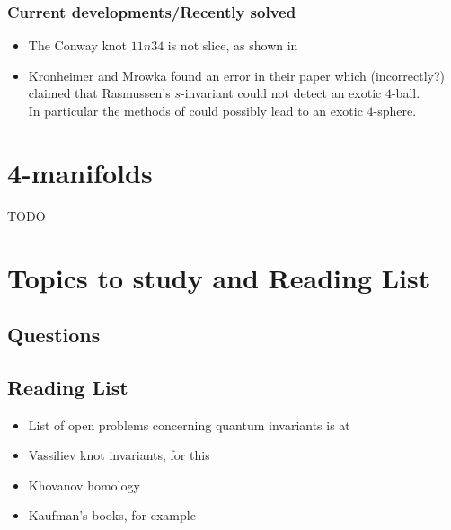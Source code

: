 \documentclass[nobib]{tufte-book} %
\theoremstyle{definition}
\theoremstyle{remark}
\begin{document}
\subsection{Current developments/Recently solved}

\begin{itemize}
	\item The Conway knot $11n34$ is not slice, as shown
	in \citep{piccirillo2018conway}
	
	\item Kronheimer and Mrowka found an error
	in their paper \citep{kronheimer2013gauge} which
	(incorrectly?) claimed that Rasmussen's $s$-invariant could
	not detect an exotic $4$-ball. \\
	In particular the methods of
	\citep{freedman2009man} could possibly lead
	to an
	exotic $4$-sphere.
	
\end{itemize}




\chapter{4-manifolds}

TODO


\chapter{Topics to study and Reading List}

\section{Questions}



\section{Reading List}

\begin{itemize}
	\item List of open problems concerning quantum invariants
		is at
		\citep{ohtsuki2002problems}
	\item Vassiliev knot invariants, for this
		\citep{bar1995vassiliev}
	\item Khovanov homology
		\citep{bar2005khovanov}
	
	\item Kaufman's books, for example
		\citep{kauffman2001knots}
\end{itemize}
\end{document}
